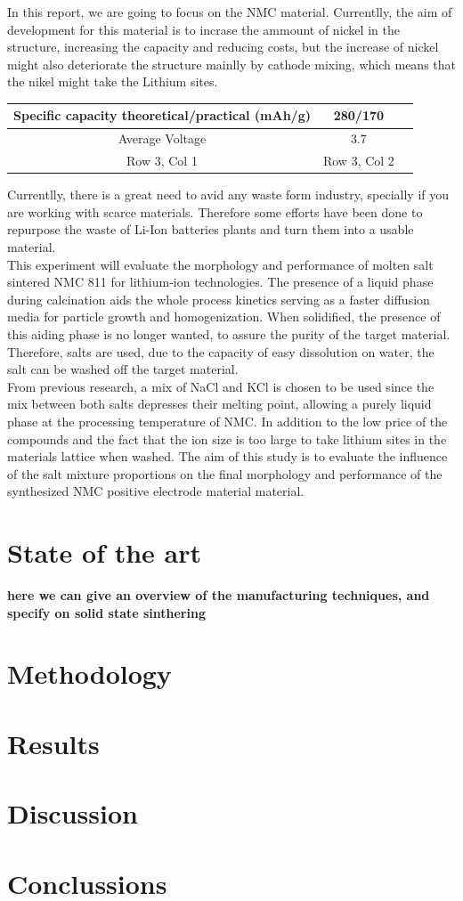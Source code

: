 \documentclass{article}
\begin{document}
In this report, we are going to focus on the NMC material. Currentlly, the aim of development
for this material is to incrase the ammount of nickel in the structure, increasing the
capacity and reducing costs, but the increase of nickel might also deteriorate the structure
mainlly by cathode mixing, which means that the nikel might take the Lithium sites.\cite{topo}\\
\begin{center}
  

\begin{tabular}{|c|c|c|}
  
  \hline
  Specific capacity
theoretical/practical
(mAh/g) & 280/170  \\
  \hline
  Average Voltage & 3.7  \\
  \hline
  Row 3, Col 1 & Row 3, Col 2 \\
  \hline
\end{tabular}
\end{center}
Currentlly, there is a great need to avid any waste form industry,
specially if you are working with scarce materials. Therefore some efforts
have been done to repurpose the waste of Li-Ion batteries plants and turn them into a
usable material.\\
This experiment will evaluate the morphology and performance of molten salt sintered NMC 811 for lithium-ion technologies. The presence of a liquid phase during calcination aids the whole process kinetics serving as a faster diffusion media for particle growth and homogenization. When solidified, the presence of this aiding phase is no longer wanted, to assure the purity of the target material.  Therefore, salts are used, due to the capacity of easy dissolution on water, the salt can be washed off the target material.\\
From previous research, a mix of NaCl and KCl is chosen to be used since the mix between both salts depresses their melting point, allowing a purely liquid phase at the processing temperature of NMC. In addition to the low price of the compounds and the fact that the ion size is too large to take lithium sites in the materials lattice when washed. The aim of this study is to evaluate the influence of the salt mixture proportions on the final morphology and performance of the synthesized NMC positive electrode material material.
\section{State of the art}
\textbf{\Huge{here we can give an overview of the manufacturing techniques,
and specify on solid state sinthering}}
\section {Methodology}
\section{Results}
\section{Discussion}
\section{Conclussions}


\newpage
  

\end{document}
